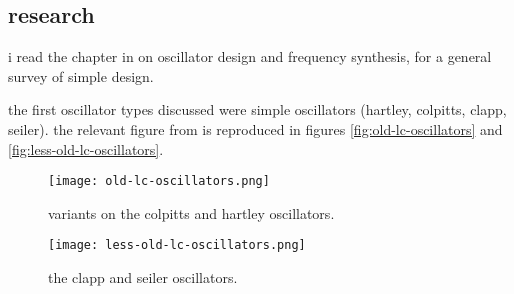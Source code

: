 \subsection*{research}
i read the chapter in \autocite{experimental-rf} on oscillator design and
frequency synthesis, for a general survey of simple \vco design.

the first oscillator types discussed were simple \lc oscillators (hartley,
colpitts, clapp, seiler). the relevant figure from \autocite{experimental-rf}
is reproduced in figures \ref{fig:old-lc-oscillators} and
\ref{fig:less-old-lc-oscillators}.

\begin{figure}[H]
	\centering
	\texttt{[image: old-lc-oscillators.png]}
	\caption{variants on the colpitts and hartley oscillators.}
	\label{fig:lc-oscillators}
\end{figure}

\begin{figure}[H]
	\centering
	\texttt{[image: less-old-lc-oscillators.png]}
	\caption{the clapp and seiler oscillators.}
	\label{fig:lc-oscillators}
\end{figure}
